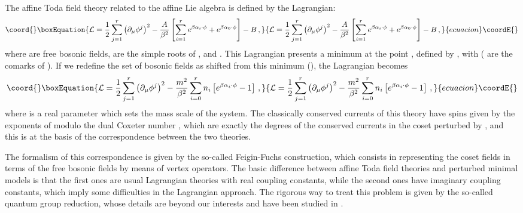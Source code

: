 \documentclass[a4paper,12pt]{report}
\begin{document}
The affine Toda field theory related to the affine Lie algebra \coordHE{} is defined by the Lagrangian:
\begin{equation}\coord{}\boxEquation{
{\cal
L}=\frac{1}{2}\sum_{j=1}^{r}\left(\partial_{\mu}\phi^{j}\right)^{2}-\frac{A}{\beta^{2}}\left[\sum_{i=1}^{r}e^{\beta\alpha_{i}\cdot\phi}+e^{\beta\alpha_{0}\cdot\phi}\right]-B\,,
}{
{\cal
L}=\frac{1}{2}\sum_{j=1}^{r}\left(\partial_{\mu}\phi^{j}\right)^{2}-\frac{A}{\beta^{2}}\left[\sum_{i=1}^{r}e^{\beta\alpha_{i}\cdot\phi}+e^{\beta\alpha_{0}\cdot\phi}\right]-B\,,
}{ecuacion}\coordE{}\end{equation}
where \coordHE{} are \coordHE{} free bosonic fields, \coordHE{} are the simple
roots of \coordHE{}, and \coordHE{}. This Lagrangian presents a minimum at the point \coordHE{}, defined by
\coordHE{}, with \coordHE{} (\coordHE{} are the
comarks of \coordHE{}). If we redefine the set of bosonic fields as shifted from this minimum
(\coordHE{}), the Lagrangian becomes
\begin{equation}\coord{}\boxEquation{\label{todalagr}
{\cal
L}=\frac{1}{2}\sum_{j=1}^{r}\left(\partial_{\mu}\phi^{j}\right)^{2}-\frac{m^{2}}{\beta^{2}}\sum_{i=0}^{r}n_{i}\left[e^{\beta\alpha_{i}\cdot\phi}-1\right]\,,
}{{\cal
L}=\frac{1}{2}\sum_{j=1}^{r}\left(\partial_{\mu}\phi^{j}\right)^{2}-\frac{m^{2}}{\beta^{2}}\sum_{i=0}^{r}n_{i}\left[e^{\beta\alpha_{i}\cdot\phi}-1\right]\,,
}{ecuacion}\coordE{}\end{equation}
where \coordHE{} is a real parameter which sets the mass scale of the system. The classically conserved currents of this
theory have spins given by the exponents of \coordHE{} modulo the dual Coxeter number \coordHE{}, which are exactly the degrees
of the conserved currents in the \coordHE{} coset perturbed by \myHighlight{$\Phi$}\coordHE{}, and this
is at the basis of the correspondence between the two theories.

The formalism of this correspondence is given by the so-called Feigin-Fuchs construction, which consists in
representing the coset fields in terms of the \coordHE{} free bosonic fields \coordHE{} by means of
vertex operators. The basic difference between affine Toda field theories and perturbed minimal models is that
the first ones are usual Lagrangian theories with real coupling constants, while the second ones have imaginary
coupling constants, which imply some difficulties in the Lagrangian approach. The rigorous way to treat this
problem is given by the so-called quantum group reduction, whose details are beyond our interests and have been
studied in \cite{smirnov}.
\end{document}
